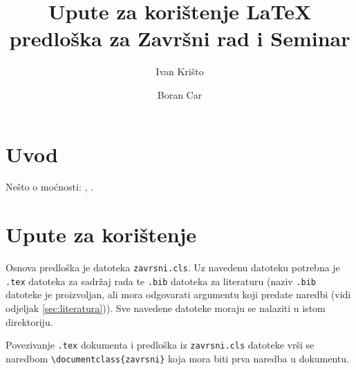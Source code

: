 \documentclass{zavrsni}
\begin{document}
\title{Upute za korištenje \LaTeX{} predloška za Završni rad i Seminar}
\author{Ivan Krišto \and Boran Car}

\maketitle

\tableofcontents

\chapter{Uvod}

Nešto o moćnosti: \citep{taraborelli2009beauty}, \citep{cottrell1999word}.

\chapter{Upute za korištenje}
Osnova predloška je datoteka \texttt{zavrsni.cls}. Uz navedenu datoteku potrebna
je \texttt{.tex} datoteka za sadržaj rada te \texttt{.bib} datoteka za literaturu
(naziv \texttt{.bib} datoteke je proizvoljan, ali mora odgovarati argumentu koji
predate naredbi \verb|| (vidi odjeljak \ref{sec:literatura})). Sve
navedene datoteke moraju se nalaziti u istom direktoriju.

Povezivanje \texttt{.tex} dokumenta i predloška iz \texttt{zavrsni.cls}
datoteke vrši se naredbom \verb|\documentclass{zavrsni}| koja mora biti prva
naredba u dokumentu.
\end{document}
